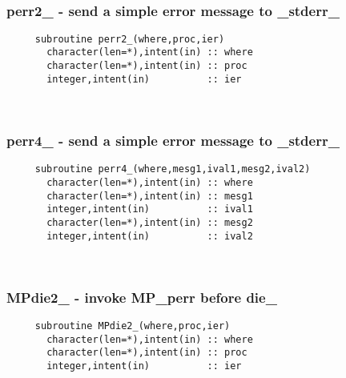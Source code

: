 \mbox{}\hrulefill\ 

  \subsubsection{perr2\_ - send a simple error message to \_stderr\_}

\begin{verbatim} 
     subroutine perr2_(where,proc,ier)
       character(len=*),intent(in) :: where
       character(len=*),intent(in) :: proc
       integer,intent(in)          :: ier
 \end{verbatim}%
 
 
\mbox{}\hrulefill\ 
 
  \subsubsection{perr4\_ - send a simple error message to \_stderr\_}

\begin{verbatim} 
     subroutine perr4_(where,mesg1,ival1,mesg2,ival2)
       character(len=*),intent(in) :: where
       character(len=*),intent(in) :: mesg1
       integer,intent(in)          :: ival1
       character(len=*),intent(in) :: mesg2
       integer,intent(in)          :: ival2
 \end{verbatim}%
 
 
\mbox{}\hrulefill\ 

  \subsubsection{MPdie2\_ - invoke MP\_perr before die\_}

\begin{verbatim} 
     subroutine MPdie2_(where,proc,ier)
       character(len=*),intent(in) :: where
       character(len=*),intent(in) :: proc
       integer,intent(in)          :: ier
 \end{verbatim}%
 
